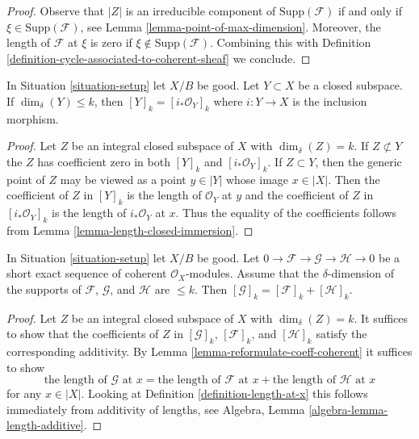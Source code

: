 \begin{proof}
Observe that $|Z|$ is an irreducible component of $\text{Supp}(\mathcal{F})$
if and only if $\xi \in \text{Supp}(\mathcal{F})$, see
Lemma \ref{lemma-point-of-max-dimension}.
Moreover, the length of $\mathcal{F}$ at $\xi$ is zero if
$\xi \not \in \text{Supp}(\mathcal{F})$. Combining this
with Definition \ref{definition-cycle-associated-to-coherent-sheaf}
we conclude.
\end{proof}

\begin{lemma}
\label{lemma-cycle-closed-coherent}
In Situation \ref{situation-setup} let $X/B$ be good.
Let $Y \subset X$ be a closed subspace.
If $\dim_\delta(Y) \leq k$, then $[Y]_k = [i_*\mathcal{O}_Y]_k$
where $i : Y \to X$ is the inclusion morphism.
\end{lemma}

\begin{proof}
Let $Z$ be an integral closed subspace of $X$ with $\dim_\delta(Z) = k$.
If $Z \not \subset Y$ the $Z$ has coefficient zero in both
$[Y]_k$ and $[i_*\mathcal{O}_Y]_k$. If $Z \subset Y$, then
the generic point of $Z$ may be viewed as a point $y \in |Y|$
whose image $x \in |X|$. Then the coefficient of $Z$ in
$[Y]_k$ is the length of $\mathcal{O}_Y$ at $y$ and the
coefficient of $Z$ in $[i_*\mathcal{O}_Y]_k$ is the length
of $i_*\mathcal{O}_Y$ at $x$. Thus the equality of the coefficients
follows from Lemma \ref{lemma-length-closed-immersion}.
\end{proof}

\begin{lemma}
\label{lemma-additivity-sheaf-cycle}
In Situation \ref{situation-setup} let $X/B$ be good.
Let $0 \to \mathcal{F} \to \mathcal{G} \to \mathcal{H} \to 0$
be a short exact sequence of coherent $\mathcal{O}_X$-modules.
Assume that the $\delta$-dimension of the supports
of $\mathcal{F}$, $\mathcal{G}$, and $\mathcal{H}$ are $\leq k$.
Then $[\mathcal{G}]_k = [\mathcal{F}]_k + [\mathcal{H}]_k$.
\end{lemma}

\begin{proof}
Let $Z$ be an integral closed subspace of $X$ with $\dim_\delta(Z) = k$.
It suffices to show that the coefficients of
$Z$ in $[\mathcal{G}]_k$, $[\mathcal{F}]_k$, and $[\mathcal{H}]_k$
satisfy the corresponding additivity. By
Lemma \ref{lemma-reformulate-coeff-coherent}
it suffices to show
$$
\text{the length of }\mathcal{G}\text{ at }x =
\text{the length of }\mathcal{F}\text{ at }x +
\text{the length of }\mathcal{H}\text{ at }x
$$
for any $x \in |X|$. Looking at Definition \ref{definition-length-at-x}
this follows immediately from additivity of lengths, see
Algebra, Lemma \ref{algebra-lemma-length-additive}.
\end{proof}






